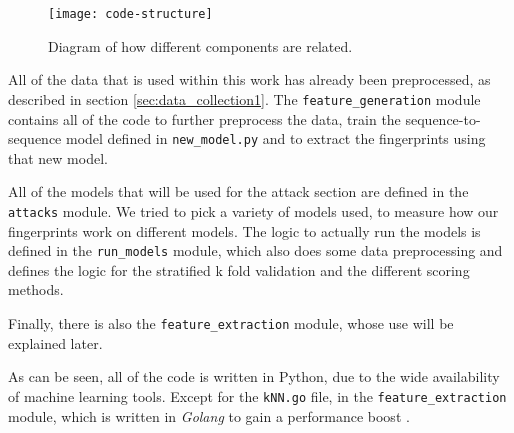 \begin{figure}[ht]
  \centering
  \texttt{[image: code-structure]}
  \caption{Diagram of how different components are related.}
  \label{fig:code-structure}
\end{figure}

All of the data that is used within this work has already been preprocessed, as described in section \ref{sec:data_collection1}.
The \texttt{feature\_generation} module contains all of the code to further preprocess the data, train the sequence-to-sequence model defined in \texttt{new\_model.py} and to extract the fingerprints using that new model.

All of the models that will be used for the attack section are defined in the \texttt{attacks} module.
We tried to pick a variety of models used, to measure how our fingerprints work on different models.
The logic to actually run the models is defined in the \texttt{run\_models} module, which also does some data preprocessing and defines the logic for the stratified k fold validation and the different scoring methods.

Finally, there is also the \texttt{feature\_extraction} module, whose use will be explained later.

As can be seen, all of the code is written in Python, due to the wide availability of machine learning tools.
Except for the \texttt{kNN.go} file, in the \texttt{feature\_extraction} module, which is written in \textit{Golang} to gain a performance boost \cite{gokNN}.
